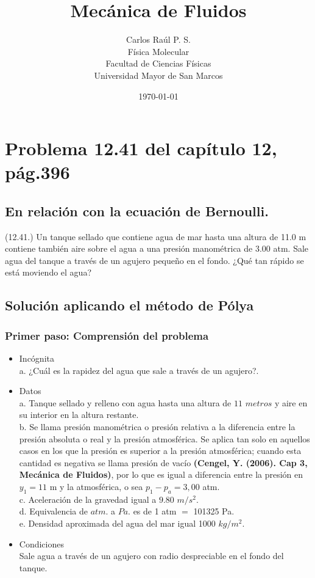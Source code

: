 \documentclass[12pt,letterpaper]{article}
\title{Mecánica de Fluidos}
\author{Carlos Raúl P. S.\\ \small{Física Molecular}\\\small{Facultad de Ciencias Físicas}\\ \small{Universidad Mayor de San Marcos}}
\date{\today}
\begin{document}
\maketitle

\section{Problema 12.41 del capítulo 12, pág.396}

\subsection{En relación con la ecuación de Bernoulli.}
(12.41.) Un tanque sellado que contiene agua de mar hasta una altura
de 11.0 m contiene también aire sobre el agua a una presión manométrica
de 3.00 atm. Sale agua del tanque a través de un agujero pequeño
en el fondo. ¿Qué tan rápido se está moviendo el agua? 

\subsection{Solución aplicando el método de Pólya}

\subsubsection{Primer paso: Comprensión del problema}

\begin{itemize}
    \item Incógnita\\
     a. ¿Cuál es la rapidez del agua  que sale a través de un agujero?.
    \item Datos \\
    a.  Tanque sellado y relleno con agua hasta una altura de $11$ $metros$ y aire en su interior en la altura restante.\\
    b.  Se llama presión manométrica o presión relativa a la diferencia entre la presión absoluta o real y la presión atmosférica. Se aplica tan solo en aquellos casos en los que la presión es superior a la presión atmosférica; cuando esta cantidad es negativa se llama presión de vacío \textbf{(Cengel, Y. (2006). Cap 3, Mecánica de Fluidos)}, por lo que es igual a diferencia entre la presión en $y_1=11$ m y la atmosférica, o sea $p_1 - p_a = 3,00$ atm.\\
    c. Aceleración de la gravedad igual a $9.80$ $m/s^2$.\\
    d. Equivalencia de $atm.$ a $Pa.$ es de 1 atm $=$ 101325 Pa.\\
    e. Densidad aproximada del agua del mar igual 1000 $kg/m^2$.
    \item Condiciones\\
    Sale agua a través de un agujero con radio despreciable en el fondo del tanque.
\end{itemize}
\end{document}
